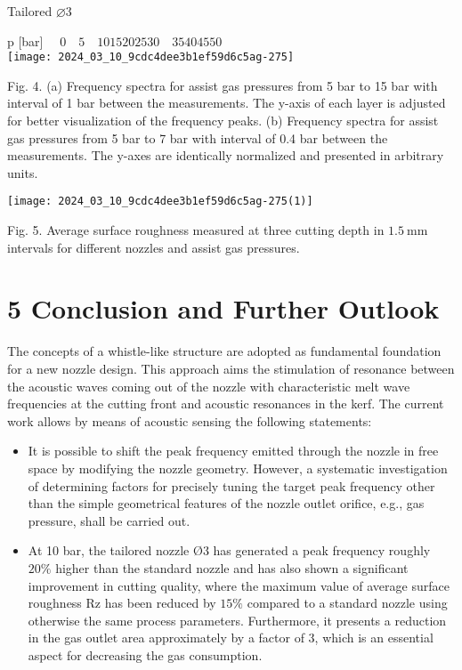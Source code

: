 \documentclass[10pt]{article}
\begin{document}
Tailored $\varnothing 3$

p [bar] $\quad 0 \quad 5 \quad 1015202530 \quad 35404550$\\
\texttt{[image: 2024\_03\_10\_9cdc4dee3b1ef59d6c5ag-275]}

Fig. 4. (a) Frequency spectra for assist gas pressures from 5 bar to 15 bar with interval of 1 bar between the measurements. The y-axis of each layer is adjusted for better visualization of the frequency peaks. (b) Frequency spectra for assist gas pressures from 5 bar to 7 bar with interval of 0.4 bar between the measurements. The y-axes are identically normalized and presented in arbitrary units.

\begin{center}
\texttt{[image: 2024\_03\_10\_9cdc4dee3b1ef59d6c5ag-275(1)]}
\end{center}

Fig. 5. Average surface roughness measured at three cutting depth in $1.5 \mathrm{~mm}$ intervals for different nozzles and assist gas pressures.

\section*{5 Conclusion and Further Outlook}
The concepts of a whistle-like structure are adopted as fundamental foundation for a new nozzle design. This approach aims the stimulation of resonance between the acoustic waves coming out of the nozzle with characteristic melt wave frequencies at the cutting front and acoustic resonances in the kerf. The current work allows by means of acoustic sensing the following statements:

\begin{itemize}
  \item It is possible to shift the peak frequency emitted through the nozzle in free space by modifying the nozzle geometry. However, a systematic investigation of determining factors for precisely tuning the target peak frequency other than the simple geometrical features of the nozzle outlet orifice, e.g., gas pressure, shall be carried out.

  \item At 10 bar, the tailored nozzle $Ø 3$ has generated a peak frequency roughly $20 \%$ higher than the standard nozzle and has also shown a significant improvement in cutting quality, where the maximum value of average surface roughness $\mathrm{Rz}$ has been reduced by $15 \%$ compared to a standard nozzle using otherwise the same process parameters. Furthermore, it presents a reduction in the gas outlet area approximately by a factor of 3, which is an essential aspect for decreasing the gas consumption.

\end{itemize}
\end{document}
